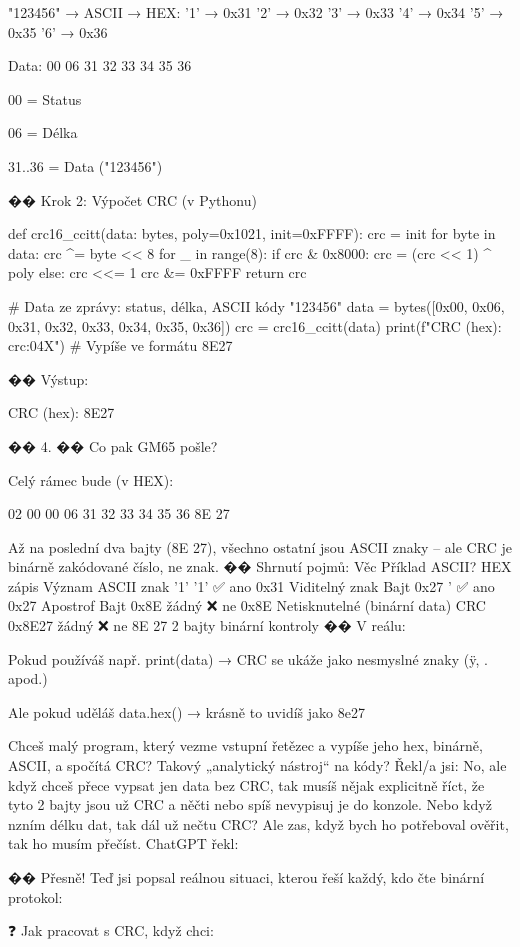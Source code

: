 "123456" → ASCII → HEX:
'1' → 0x31
'2' → 0x32
'3' → 0x33
'4' → 0x34
'5' → 0x35
'6' → 0x36

Data: 00 06 31 32 33 34 35 36

    00 = Status

    06 = Délka

    31..36 = Data ("123456")

�� Krok 2: Výpočet CRC (v Pythonu)

def crc16_ccitt(data: bytes, poly=0x1021, init=0xFFFF):
    crc = init
    for byte in data:
        crc ^= byte << 8
        for _ in range(8):
            if crc & 0x8000:
                crc = (crc << 1) ^ poly
            else:
                crc <<= 1
            crc &= 0xFFFF
    return crc

# Data ze zprávy: status, délka, ASCII kódy "123456"
data = bytes([0x00, 0x06, 0x31, 0x32, 0x33, 0x34, 0x35, 0x36])
crc = crc16_ccitt(data)
print(f"CRC (hex): {crc:04X}")  # Vypíše ve formátu 8E27

�� Výstup:

CRC (hex): 8E27

�� 4. �� Co pak GM65 pošle?

Celý rámec bude (v HEX):

02 00 00 06 31 32 33 34 35 36 8E 27

Až na poslední dva bajty (8E 27), všechno ostatní jsou ASCII znaky – ale CRC je binárně zakódované číslo, ne znak.
�� Shrnutí pojmů:
Věc	Příklad	ASCII?	HEX zápis	Význam
ASCII znak '1'	'1'	✅ ano	0x31	Viditelný znak
Bajt 0x27	'	✅ ano	0x27	Apostrof
Bajt 0x8E	žádný	❌ ne	0x8E	Netisknutelné (binární data)
CRC 0x8E27	žádný	❌ ne	8E 27	2 bajty binární kontroly
�� V reálu:

    Pokud používáš např. print(data) → CRC se ukáže jako nesmyslné znaky (ÿ, . apod.)

    Ale pokud uděláš data.hex() → krásně to uvidíš jako 8e27

Chceš malý program, který vezme vstupní řetězec a vypíše jeho hex, binárně, ASCII, a spočítá CRC? Takový „analytický nástroj“ na kódy?
Řekl/a jsi:
No, ale když chceš přece vypsat jen data bez CRC, tak musíš nějak explicitně říct, že tyto 2 bajty jsou už CRC a něčti nebo spíš nevypisuj je do konzole. Nebo když nzním délku dat, tak dál už nečtu CRC? Ale zas, když bych ho potřeboval ověřit, tak ho musím přečíst.
ChatGPT řekl:

�� Přesně! Teď jsi popsal reálnou situaci, kterou řeší každý, kdo čte binární protokol:

    ❓ Jak pracovat s CRC, když chci:

